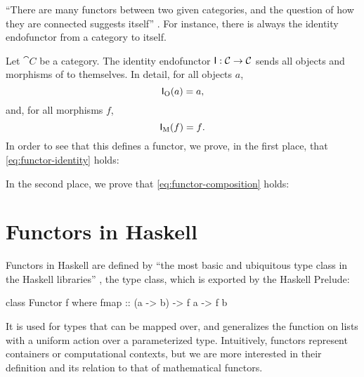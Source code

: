 ``There are many functors between two given categories, and the
question of how they are connected suggests itself''
\parencite[11]{marquis-2013}. For instance, there is always the
identity endofunctor from a category to itself.

\begin{example}
  \label{ex:functor-identity}


  Let $\cat{C}$ be a category. The identity endofunctor $\mathsf{I}:
  \mathcal{C} \to \mathcal{C}$ sends all objects and morphisms of  to
  themselves. In detail, for all objects $a$,
  \begin{equation}
    \label{eq:functor-identity-object}
    \mathsf{I}_{\operatorname{O}}(a) = a
    \text{,}
  \end{equation}
  and, for all morphisms $f$,
  \begin{equation}
    \label{eq:functor-identity-morphism}
    \mathsf{I}_{\operatorname{M}}(f) = f
    \text{.}
  \end{equation}
  In order to see that this defines a functor, we prove, in the first
  place, that \eqref{eq:functor-identity} holds:
  \begin{steps}
      \eqby{\eqref{eq:functor-identity-object}}
  \end{steps}
  In the second place, we prove that \eqref{eq:functor-composition}
  holds:
  \begin{steps}
  \end{steps}

\end{example}

\section{Functors in Haskell}
\label{sec:functors-haskell}

Functors in Haskell are defined by ``the most basic and ubiquitous
type class in the Haskell libraries'' \parencite[18]{yorgey-2009}, the
 type class, which is exported by the Haskell
Prelude:
\begin{codehaskell}
class Functor f where
  fmap :: (a -> b) -> f a -> f b
\end{codehaskell}
It is used for types that can be mapped over, and generalizes the
 function on lists with a uniform action over a
parameterized type. Intuitively, functors represent containers or
computational contexts, but we are more interested in their definition
and its relation to that of mathematical functors.

